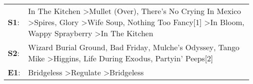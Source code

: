 \begin{supertabular}{p{0.03\textwidth}p{0.92\textwidth}}
 \textbf{S1}:  &  In The Kitchen\textsuperscript{} \textgreater \enspace Mullet (Over)\textsuperscript{}, \enspace There's No Crying In Mexico\textsuperscript{} \textgreater \enspace Spires\textsuperscript{}, \enspace Glory\textsuperscript{} \textgreater \enspace Wife Soup\textsuperscript{}, \enspace Nothing Too Fancy[1]\textsuperscript{} \textgreater \enspace In Bloom\textsuperscript{}, \enspace Wappy Sprayberry\textsuperscript{} \textgreater \enspace In The Kitchen\textsuperscript{}  \enspace  \\
 \textbf{S2}:  &                                                                                                                                                                           Wizard Burial Ground\textsuperscript{}, \enspace Bad Friday\textsuperscript{}, \enspace Mulche's Odyssey\textsuperscript{}, \enspace Tango Mike\textsuperscript{} \textgreater \enspace Higgins\textsuperscript{}, \enspace Life During Exodus\textsuperscript{}, \enspace Partyin' Peeps[2]\textsuperscript{}  \enspace  \\
 \textbf{E1}:  &                                                                                                                                                                                                                                                                                                                                                         Bridgeless\textsuperscript{} \textgreater \enspace Regulate\textsuperscript{} \textgreater \enspace Bridgeless\textsuperscript{}  \enspace  \\
\end{supertabular}
